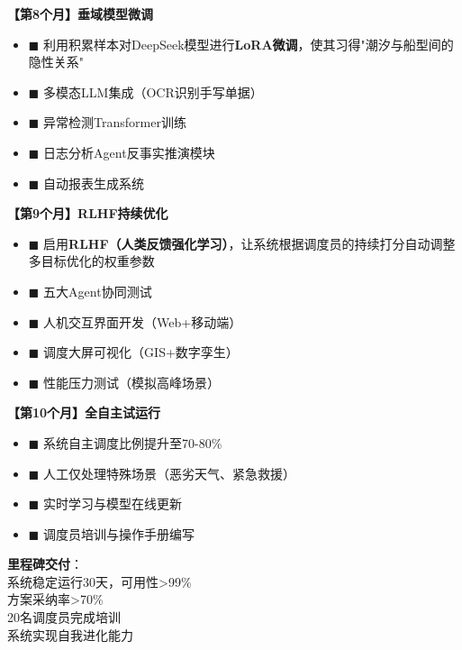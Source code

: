 \documentclass[12pt,a4paper]{article}
\begin{document}
\begin{tcolorbox}[colback=green!5!white,colframe=green!60!black,title=\textbf{阶段目标：实现隐性知识的自动化推理，系统自我进化}]

\textbf{【第8个月】垂域模型微调}

\begin{itemize}[label={}, leftmargin=*, itemsep=3pt]
    \item \textcolor{green!60!black}{$\blacksquare$} 利用积累样本对DeepSeek模型进行\textbf{LoRA微调}，使其习得"潮汐与船型间的隐性关系"
    \item \textcolor{green!60!black}{$\blacksquare$} 多模态LLM集成（OCR识别手写单据）
    \item \textcolor{green!60!black}{$\blacksquare$} 异常检测Transformer训练
    \item \textcolor{green!60!black}{$\blacksquare$} 日志分析Agent反事实推演模块
    \item \textcolor{green!60!black}{$\blacksquare$} 自动报表生成系统
\end{itemize}

\textbf{【第9个月】RLHF持续优化}

\begin{itemize}[label={}, leftmargin=*, itemsep=3pt]
    \item \textcolor{green!60!black}{$\blacksquare$} 启用\textbf{RLHF（人类反馈强化学习）}，让系统根据调度员的持续打分自动调整多目标优化的权重参数
    \item \textcolor{green!60!black}{$\blacksquare$} 五大Agent协同测试
    \item \textcolor{green!60!black}{$\blacksquare$} 人机交互界面开发（Web+移动端）
    \item \textcolor{green!60!black}{$\blacksquare$} 调度大屏可视化（GIS+数字孪生）
    \item \textcolor{green!60!black}{$\blacksquare$} 性能压力测试（模拟高峰场景）
\end{itemize}

\textbf{【第10个月】全自主试运行}

\begin{itemize}[label={}, leftmargin=*, itemsep=3pt]
    \item \textcolor{green!60!black}{$\blacksquare$} 系统自主调度比例提升至70-80\%
    \item \textcolor{green!60!black}{$\blacksquare$} 人工仅处理特殊场景（恶劣天气、紧急救援）
    \item \textcolor{green!60!black}{$\blacksquare$} 实时学习与模型在线更新
    \item \textcolor{green!60!black}{$\blacksquare$} 调度员培训与操作手册编写
\end{itemize}

\vspace{0.3cm}
\colorbox{green!20}{\parbox{0.95\linewidth}{
\textbf{里程碑交付}：\\
\checkmark 系统稳定运行30天，可用性>99\%\\
\checkmark 方案采纳率>70\%\\
\checkmark 20名调度员完成培训\\
\checkmark 系统实现自我进化能力
}}
\end{tcolorbox}
\end{document}
